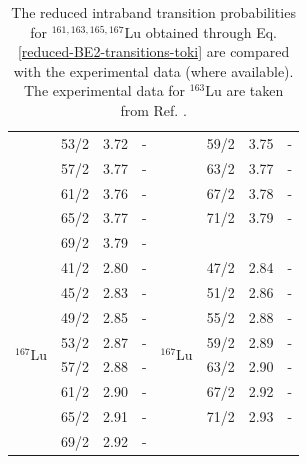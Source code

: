 \begin{table}
\begin{tabular}{|c|c|c|c|c|ccc|}
    & 53/2 & 3.72 & - &  & \multicolumn{1}{c|}{59/2} & \multicolumn{1}{c|}{3.75} & - \\ \cline{2-4} \cline{6-8} 
    & 57/2 & 3.77 & - &  & \multicolumn{1}{c|}{63/2} & \multicolumn{1}{c|}{3.77} & - \\ \cline{2-4} \cline{6-8} 
    & 61/2 & 3.76 & - &  & \multicolumn{1}{c|}{67/2} & \multicolumn{1}{c|}{3.78} & - \\ \cline{2-4} \cline{6-8} 
    & 65/2 & 3.77 & - &  & \multicolumn{1}{c|}{71/2} & \multicolumn{1}{c|}{3.79} & - \\ \cline{2-4} \cline{6-8} 
    & 69/2 & 3.79 & - &  & \multicolumn{3}{c|}{}                                     \\ \hline
    \multirow{8}{*}{$^{167}$Lu} & 41/2 & 2.80 & - & \multirow{8}{*}{$^{167}$Lu} & \multicolumn{1}{c|}{47/2} & \multicolumn{1}{c|}{2.84} & - \\ \cline{2-4} \cline{6-8} 
    & 45/2 & 2.83 & - &  & \multicolumn{1}{c|}{51/2} & \multicolumn{1}{c|}{2.86} & - \\ \cline{2-4} \cline{6-8} 
    & 49/2 & 2.85 & - &  & \multicolumn{1}{c|}{55/2} & \multicolumn{1}{c|}{2.88} & - \\ \cline{2-4} \cline{6-8} 
    & 53/2 & 2.87 & - &  & \multicolumn{1}{c|}{59/2} & \multicolumn{1}{c|}{2.89} & - \\ \cline{2-4} \cline{6-8} 
    & 57/2 & 2.88 & - &  & \multicolumn{1}{c|}{63/2} & \multicolumn{1}{c|}{2.90} & - \\ \cline{2-4} \cline{6-8} 
    & 61/2 & 2.90 & - &  & \multicolumn{1}{c|}{67/2} & \multicolumn{1}{c|}{2.92} & - \\ \cline{2-4} \cline{6-8} 
    & 65/2 & 2.91 & - &  & \multicolumn{1}{c|}{71/2} & \multicolumn{1}{c|}{2.93} & - \\ \cline{2-4} \cline{6-8} 
    & 69/2 & 2.92 & - &  & \multicolumn{3}{c|}{}                                     \\ \hline
    \end{tabular}
    \caption{The reduced intraband transition probabilities for $^{161,163,165,167}$Lu obtained through Eq. \ref{reduced-BE2-transitions-toki} are compared with the experimental data (where available). The experimental data for $^{163}$Lu are taken from Ref. \cite{reich2010nuclear}.}
    \label{table-intraband-E2-numerical-results}
\end{table}
